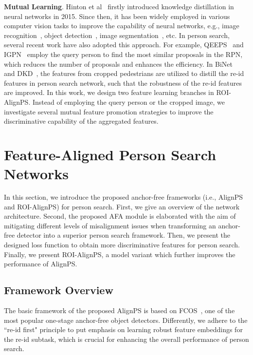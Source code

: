 \documentclass[journal]{IEEEtran}
\begin{document}
\textbf{Mutual Learning}. Hinton et al~\cite{DBLP:journals/corr/HintonVD15} firstly introduced knowledge distillation in neural networks in 2015. Since then, it has been widely employed in various computer vision tasks to improve the capability of neural networks, e.g., image recognition~\cite{DBLP:journals/pami/LiH18a,DBLP:conf/eccv/WangFLWLM20,DBLP:conf/iccv/PengLZLQT19}, object detection~\cite{DBLP:conf/cvpr/LiJY17,DBLP:conf/nips/ChenCYHC17,DBLP:conf/cvpr/ZhuHLD19}, image segmentation~\cite{DBLP:conf/iccv/MullapudiCZRF19,DBLP:conf/cvpr/LiuCLQLW19,DBLP:conf/cvpr/Hou0LHL20}, etc. In person search, several recent work have also adopted this approach. For example, QEEPS~\cite{DBLP:conf/cvpr/MunjalATG19} and IGPN~\cite{DBLP:conf/cvpr/DongZST20} employ the query person to find the most similar proposals in the RPN, which reduces the number of proposals and enhances the efficiency. In BiNet~\cite{DBLP:conf/cvpr/DongZST20a} and DKD~\cite{DBLP:conf/aaai/ZhangWBSY21}, the features from cropped pedestrians are utilized to distill the re-id features in person search network, such that the robustness of the re-id features are improved. In this work, we design two feature learning branches in ROI-AlignPS. Instead of employing the query person or the cropped image, we investigate several mutual feature promotion strategies to improve the discriminative capability of the aggregated features.



\section{Feature-Aligned Person Search Networks}
In this section, we introduce the proposed anchor-free frameworks (i.e., AlignPS and ROI-AlignPS) for person search. First, we give an overview of the network architecture. Second, the proposed AFA module is elaborated with the aim of mitigating different levels of misalignment issues when transforming an anchor-free detector into a superior person search framework. Then, we present the designed loss function to obtain more discriminative features for person search. Finally, we present ROI-AlignPS, a model variant which further improves the performance of AlignPS.

\subsection{Framework Overview}
The basic framework of the proposed AlignPS is based on FCOS~\cite{DBLP:conf/iccv/TianSCH19}, one of the most popular one-stage anchor-free object detectors. Differently, we adhere to the ``re-id first" principle to put emphasis on learning robust feature embeddings for the re-id subtask, which is crucial for enhancing the overall performance of person search.
\end{document}
